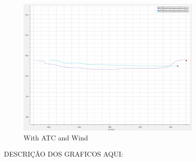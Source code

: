 \begin{figure}[H]
            \begin{subfigure}[b]{0.45\textwidth}
                \centering
                \includegraphics[width=\textwidth]{figs/plot_overtaking_Wind_E.png}
                \caption{With \ac{ATC} and Wind}
                \label{fig:plot_overtaking_Wind_E}
            \end{subfigure}
        
        \caption{DESCRIÇÂO DOS GRAFICOS AQUI: }
        \label{fig:overtaking_E}
        \end{figure}

        
        
        

